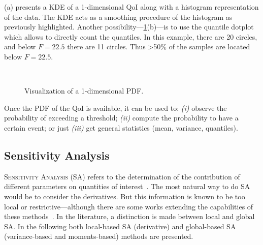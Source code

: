 (a) presents a KDE of a 1-dimensional QoI along with a histogram representation of the data. The KDE acts as a smoothing procedure of the histogram as previously highlighted. Another possibility---\cref{fig:ex_pdf}(b)---is to use the quantile dotplot \cite{kay2016} which allows to directly count the quantiles. In this example, there are 20 circles, and below $F=22.5$ there are 11 circles. Thus >50\% of the samples are located below $F=22.5$.

\begin{figure}[!ht]               
\centering
{}
 ~       
\caption{Visualization of a 1-dimensional PDF.}
\label{fig:ex_pdf}
\end{figure}

Once the PDF of the QoI is available, it can be used to: \emph{(i)} observe the probability of exceeding a threshold; \emph{(ii)} compute the probability to have a certain event; or just \emph{(iii)} get general statistics (mean, variance, quantiles).

\subsection{Sensitivity Analysis}\label{sec:sa}
\lettrine{S}{ensitivity Analysis} (SA) refers to the determination of the contribution of different parameters on quantities of interest~\cite{Saltelli2007,iooss2016}. The most natural way to do SA would be to consider the derivatives. But this information is known to be too local or restrictive---although there are some works extending the capabilities of these methods~\cite{kucherenko2016}. In the literature, a distinction is made between local and global SA. In the following both local-based SA (derivative) and global-based SA (variance-based and moments-based) methods are presented.


